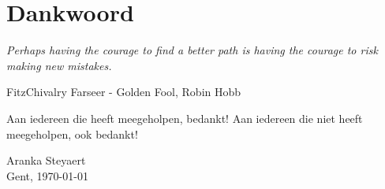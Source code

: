 \cleardoublepage

\normalsize

\chapter{Dankwoord}
\setlength{\epigraphrule}{0pt}
\setlength{\epigraphwidth}{0.75\textwidth}
\epigraph{\textit{Perhaps having the courage to find a better path is having the courage to risk making new mistakes.}}{FitzChivalry Farseer - Golden Fool, Robin Hobb}

Aan iedereen die heeft meegeholpen, bedankt! Aan iedereen die niet heeft meegeholpen, ook bedankt!


\vspace*{\fill}

\begin{flushright}
Aranka Steyaert \\
Gent, \today
\end{flushright}

\vspace*{\fill}


